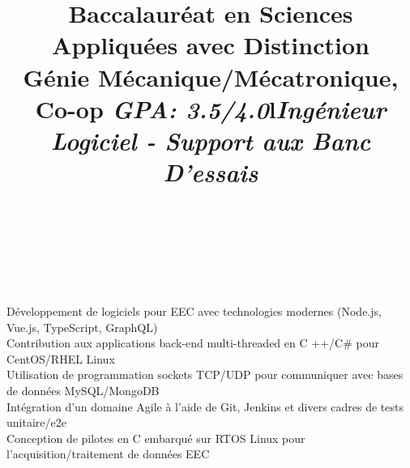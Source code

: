 \documentclass[mm]{res}
\begin{document}
\begin{resume}
\title{Baccalaur\'eat en Sciences Appliqu\'ees avec Distinction\\
G\'enie M\'ecanique/M\'ecatronique, Co-op \textsl{GPA: 3.5/4.0}}
\begin{position}
\end{position}


\toprule

\section{\headingexperience}
\begin{format}
\\
\title{l}\\
\body\\
\end{format}


\title{\textsl{Ing\'enieur Logiciel - Support aux Banc D'essais}}
\begin{position}
\tb D\'eveloppement de logiciels pour EEC avec technologies modernes (Node.js, Vue.js, TypeScript, GraphQL)\\
\tb Contribution aux applications back-end multi-threaded en C ++/C\# pour CentOS/RHEL Linux\\
\tb Utilisation de programmation sockets TCP/UDP pour communiquer avec bases de donn\'ees MySQL/MongoDB\\
\tb Int\'egration d'un domaine Agile \`a l'aide de Git, Jenkins et divers cadres de tests unitaire/e2e\\
\tb Conception de pilotes en C embarqu\'e sur RTOS Linux pour l'acquisition/traitement de donn\'ees EEC
\end{position}


\end{resume}
\end{document}
